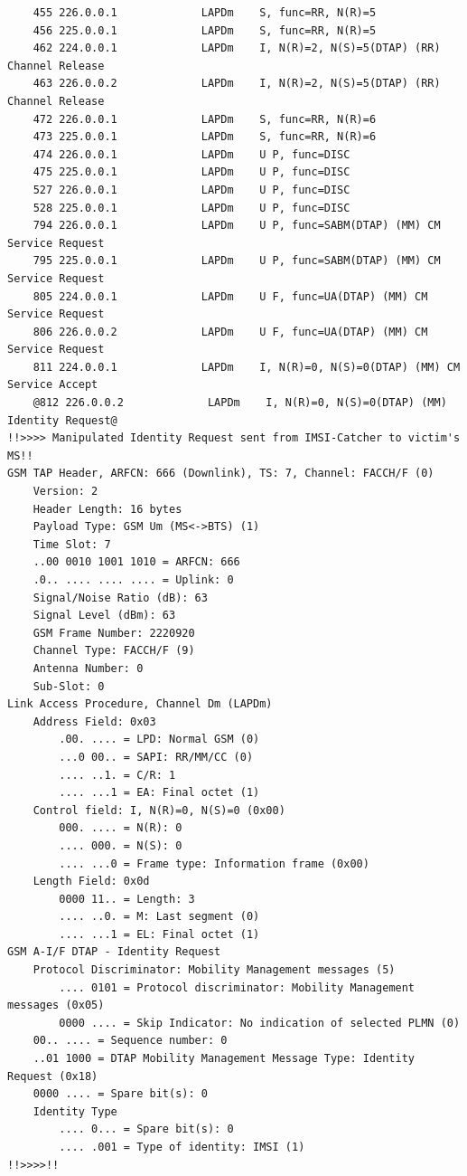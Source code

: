 \begin{lstlisting}
    455 226.0.0.1             LAPDm    S, func=RR, N(R)=5
    456 225.0.0.1             LAPDm    S, func=RR, N(R)=5
    462 224.0.0.1             LAPDm    I, N(R)=2, N(S)=5(DTAP) (RR) Channel Release 
    463 226.0.0.2             LAPDm    I, N(R)=2, N(S)=5(DTAP) (RR) Channel Release 
    472 226.0.0.1             LAPDm    S, func=RR, N(R)=6
    473 225.0.0.1             LAPDm    S, func=RR, N(R)=6
    474 226.0.0.1             LAPDm    U P, func=DISC
    475 225.0.0.1             LAPDm    U P, func=DISC
    527 226.0.0.1             LAPDm    U P, func=DISC
    528 225.0.0.1             LAPDm    U P, func=DISC
    794 226.0.0.1             LAPDm    U P, func=SABM(DTAP) (MM) CM Service Request 
    795 225.0.0.1             LAPDm    U P, func=SABM(DTAP) (MM) CM Service Request 
    805 224.0.0.1             LAPDm    U F, func=UA(DTAP) (MM) CM Service Request 
    806 226.0.0.2             LAPDm    U F, func=UA(DTAP) (MM) CM Service Request 
    811 224.0.0.1             LAPDm    I, N(R)=0, N(S)=0(DTAP) (MM) CM Service Accept 
    @812 226.0.0.2             LAPDm    I, N(R)=0, N(S)=0(DTAP) (MM) Identity Request@
!!>>>> Manipulated Identity Request sent from IMSI-Catcher to victim's MS!!
GSM TAP Header, ARFCN: 666 (Downlink), TS: 7, Channel: FACCH/F (0)
    Version: 2
    Header Length: 16 bytes
    Payload Type: GSM Um (MS<->BTS) (1)
    Time Slot: 7
    ..00 0010 1001 1010 = ARFCN: 666
    .0.. .... .... .... = Uplink: 0
    Signal/Noise Ratio (dB): 63
    Signal Level (dBm): 63
    GSM Frame Number: 2220920
    Channel Type: FACCH/F (9)
    Antenna Number: 0
    Sub-Slot: 0
Link Access Procedure, Channel Dm (LAPDm)
    Address Field: 0x03
        .00. .... = LPD: Normal GSM (0)
        ...0 00.. = SAPI: RR/MM/CC (0)
        .... ..1. = C/R: 1
        .... ...1 = EA: Final octet (1)
    Control field: I, N(R)=0, N(S)=0 (0x00)
        000. .... = N(R): 0
        .... 000. = N(S): 0
        .... ...0 = Frame type: Information frame (0x00)
    Length Field: 0x0d
        0000 11.. = Length: 3
        .... ..0. = M: Last segment (0)
        .... ...1 = EL: Final octet (1)
GSM A-I/F DTAP - Identity Request
    Protocol Discriminator: Mobility Management messages (5)
        .... 0101 = Protocol discriminator: Mobility Management messages (0x05)
        0000 .... = Skip Indicator: No indication of selected PLMN (0)
    00.. .... = Sequence number: 0
    ..01 1000 = DTAP Mobility Management Message Type: Identity Request (0x18)
    0000 .... = Spare bit(s): 0
    Identity Type
        .... 0... = Spare bit(s): 0
        .... .001 = Type of identity: IMSI (1)
!!>>>>!!

\end{lstlisting}

